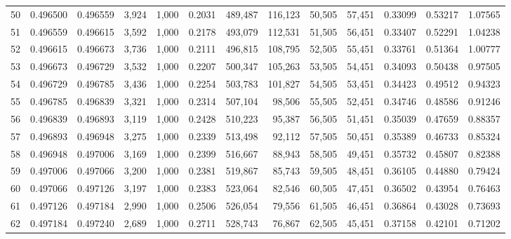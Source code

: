 \begin{tabular}{rrrrrrrrrrrrr}
50  &  0.496500 &  0.496559 &   3,924 &  1,000 &                                     0.2031 &  489,487 &  116,123 &   50,505 &   57,451 &  0.33099 &  0.53217 &  1.07565 \\
51  &  0.496559 &  0.496615 &   3,592 &  1,000 &                                     0.2178 &  493,079 &  112,531 &   51,505 &   56,451 &  0.33407 &  0.52291 &  1.04238 \\
52  &  0.496615 &  0.496673 &   3,736 &  1,000 &                                     0.2111 &  496,815 &  108,795 &   52,505 &   55,451 &  0.33761 &  0.51364 &  1.00777 \\
53  &  0.496673 &  0.496729 &   3,532 &  1,000 &                                     0.2207 &  500,347 &  105,263 &   53,505 &   54,451 &  0.34093 &  0.50438 &  0.97505 \\
54  &  0.496729 &  0.496785 &   3,436 &  1,000 &                                     0.2254 &  503,783 &  101,827 &   54,505 &   53,451 &  0.34423 &  0.49512 &  0.94323 \\
55  &  0.496785 &  0.496839 &   3,321 &  1,000 &                                     0.2314 &  507,104 &   98,506 &   55,505 &   52,451 &  0.34746 &  0.48586 &  0.91246 \\
56  &  0.496839 &  0.496893 &   3,119 &  1,000 &                                     0.2428 &  510,223 &   95,387 &   56,505 &   51,451 &  0.35039 &  0.47659 &  0.88357 \\
57  &  0.496893 &  0.496948 &   3,275 &  1,000 &                                     0.2339 &  513,498 &   92,112 &   57,505 &   50,451 &  0.35389 &  0.46733 &  0.85324 \\
58  &  0.496948 &  0.497006 &   3,169 &  1,000 &                                     0.2399 &  516,667 &   88,943 &   58,505 &   49,451 &  0.35732 &  0.45807 &  0.82388 \\
59  &  0.497006 &  0.497066 &   3,200 &  1,000 &                                     0.2381 &  519,867 &   85,743 &   59,505 &   48,451 &  0.36105 &  0.44880 &  0.79424 \\
60  &  0.497066 &  0.497126 &   3,197 &  1,000 &                                     0.2383 &  523,064 &   82,546 &   60,505 &   47,451 &  0.36502 &  0.43954 &  0.76463 \\
61  &  0.497126 &  0.497184 &   2,990 &  1,000 &                                     0.2506 &  526,054 &   79,556 &   61,505 &   46,451 &  0.36864 &  0.43028 &  0.73693 \\
62  &  0.497184 &  0.497240 &   2,689 &  1,000 &                                     0.2711 &  528,743 &   76,867 &   62,505 &   45,451 &  0.37158 &  0.42101 &  0.71202 \\

\end{tabular}
